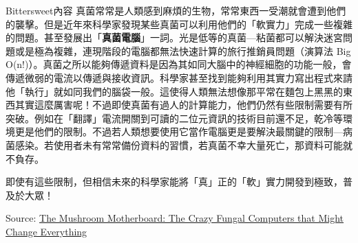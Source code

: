 \documentclass{article}
\begin{document}
\begin{boxpar}{Bittersweet}{內容}
真菌常常是人類感到麻煩的生物，常常東西一受潮就會遭到他們的襲擊。但是近年來科學家發現某些真菌可以利用他們的「軟實力」完成一些複雜的問題。甚至發展出「\textbf{真菌電腦}」一詞。光是低等的真菌—粘菌都可以解決迷宮問題或是極為複雜，連現階段的電腦都無法快速計算的旅行推銷員問題（演算法 Big O(n!)）。真菌之所以能夠傳遞資料是因為其如同大腦中的神經細胞的功能一般，會傳遞微弱的電流以傳遞與接收資訊。科學家甚至找到能夠利用其實力寫出程式來請他「執行」就如同我們的腦袋一般。這使得人類無法想像那平常在麵包上黑黑的東西其實這麼厲害呢！不過即使真菌有過人的計算能力，他們仍然有些限制需要有所突破。例如在「翻譯」電流開關到可讀的二位元資訊的技術目前還不足，乾冷等環境更是他們的限制。不過若人類想要使用它當作電腦更是要解決最關鍵的限制—病菌感染。若使用者未有常常備份資料的習慣，若真菌不幸大量死亡，那資料可能就不負存。

即使有這些限制，但相信未來的科學家能將「真」正的「軟」實力開發到極致，普及於大眾！

Source: \href{https://www.youtube.com/watch?v=5mIWo6dgTmI}{The Mushroom Motherboard: The Crazy Fungal Computers that Might Change Everything}
\end{boxpar}
\end{document}
